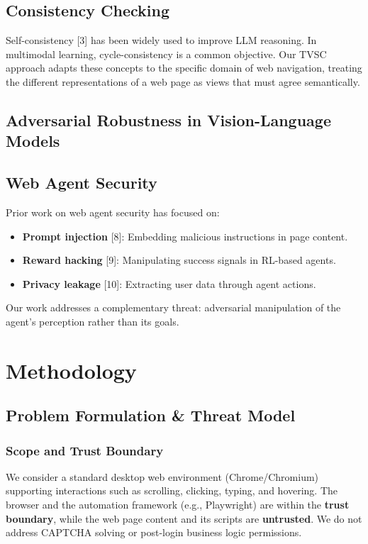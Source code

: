 \documentclass{llncs}
\begin{document}
\subsection{Consistency Checking}
Self-consistency [3] has been widely used to improve LLM reasoning. In multimodal learning, cycle-consistency is a common objective. Our TVSC approach adapts these concepts to the specific domain of web navigation, treating the different representations of a web page as views that must agree semantically.

\subsection{Adversarial Robustness in Vision-Language Models}



\subsection{Web Agent Security}
Prior work on web agent security has focused on:
\begin{itemize}
    \item \textbf{Prompt injection} [8]: Embedding malicious instructions in page content.
    \item \textbf{Reward hacking} [9]: Manipulating success signals in RL-based agents.
    \item \textbf{Privacy leakage} [10]: Extracting user data through agent actions.
\end{itemize}
Our work addresses a complementary threat: adversarial manipulation of the agent's perception rather than its goals.

\section{Methodology}

\subsection{Problem Formulation \& Threat Model}

\subsubsection{Scope and Trust Boundary}
We consider a standard desktop web environment (Chrome/Chromium) supporting interactions such as scrolling, clicking, typing, and hovering. The browser and the automation framework (e.g., Playwright) are within the \textbf{trust boundary}, while the web page content and its scripts are \textbf{untrusted}. We do not address CAPTCHA solving or post-login business logic permissions.
\end{document}
